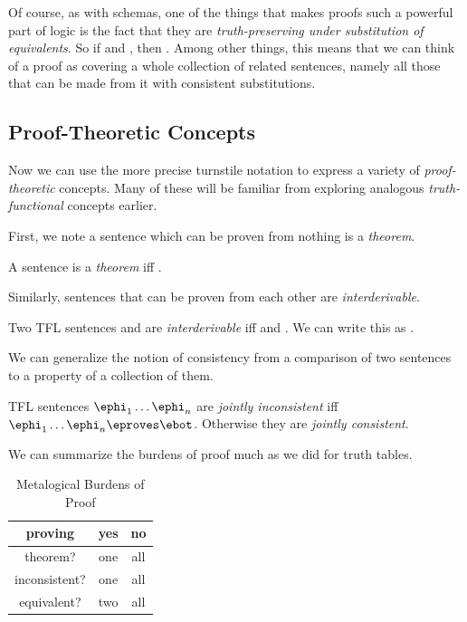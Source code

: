 Of course, as with schemas, one of the things that makes proofs such a powerful
part of logic is the fact that they are \emph{truth-preserving under
substitution of equivalents}. So if \ephi\eproves\echi and \ephi\eiff\epsi,
then \epsi\eproves\echi. Among other things, this means that we can think of a
proof as covering a whole collection of related sentences, namely all those
that can be made from it with consistent substitutions.

\subsection{Proof-Theoretic Concepts}

Now we can use the more precise turnstile notation to express a variety of
\emph{proof-theoretic} concepts. Many of these will be familiar from exploring
analogous \emph{truth-functional} concepts earlier.

First, we note a sentence which can be proven from nothing is a \emph{theorem}.

\begin{definition}[Theorem]
  \label{def:theorem}
  A sentence \ephi is a \emph{theorem} iff \eproves\ephi.
\end{definition}

Similarly, sentences that can be proven from each other are
\emph{interderivable}.

\begin{definition}[Interderivable]
  \label{def:interderivable}
  Two TFL sentences \ephi and \epsi are \emph{interderivable} iff
  \ephi\eproves\epsi and \epsi\eproves\ephi. We can write this as
  \ephi\efollows\eproves\epsi.
\end{definition}

We can generalize the notion of consistency from a comparison of two sentences
to a property of a collection of them.

\begin{definition}
  \label{def:joint-consistency}
  TFL sentences $\ephi_1\dots\ephi_n$ are \emph{jointly inconsistent} iff
  $\ephi_1\dots\ephi_n\eproves\ebot$. Otherwise they are \emph{jointly
  consistent}.
\end{definition}

We can summarize the burdens of proof much as we did for truth tables.

\begin{table}[h]
  \centering
  \begin{tabular}{|c||c|c|}
    \hline
    proving       & \textbf{yes} & \textbf{no} \\
    \hline
    theorem?      & one          & all         \\
    inconsistent? & one          & all         \\
    equivalent?   & two          & all         \\
    \hline
  \end{tabular}
  \caption{Metalogical Burdens of Proof}
\end{table}

